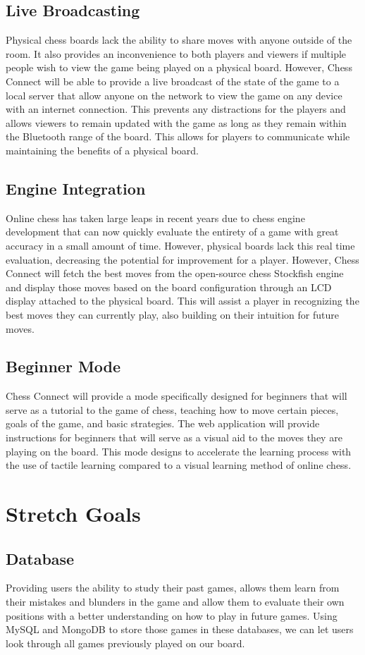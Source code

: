 \documentclass{article}
\begin{document}
\subsection{Live Broadcasting}
{Physical chess boards lack the ability to share moves with anyone outside of the room. It also provides an inconvenience to both players and viewers if multiple people wish to view the game being played on a physical board. However, Chess Connect will be able to provide a live broadcast of the state of the game to a local server that allow anyone on the network to view the game on any device with an internet connection. This prevents any distractions for the players and allows viewers to remain updated with the game as long as they remain within the Bluetooth range of the board. This allows for players to communicate while maintaining the benefits of a physical board.} 
\subsection{Engine Integration}
{Online chess has taken large leaps in recent years due to chess engine development that can now quickly evaluate the entirety of a game with great accuracy in a small amount of time. However, physical boards lack this real time evaluation, decreasing the potential for improvement for a player. However, Chess Connect will fetch the best moves from the open-source chess Stockfish engine and display those moves based on the board configuration through an LCD display attached to the physical board. This will assist a player in recognizing the best moves they can currently play, also building on their intuition for future moves.}
\subsection{Beginner Mode}
{Chess Connect will provide a mode specifically designed for beginners that will serve as a tutorial to the game of chess, teaching how to move certain pieces, goals of the game, and basic strategies. The web application will provide instructions for beginners that will serve as a visual aid to the moves they are playing on the board. This mode designs to accelerate the learning process with the use of tactile learning compared to a visual learning method of online chess.}

\section{Stretch Goals}
\subsection{Database}
Providing users the ability to study their past games, allows them learn from their mistakes and blunders in the game and allow them to evaluate their own positions with a better understanding on how to play in future games. Using MySQL and MongoDB to store those games in these databases, we can let users look through all games previously played on our board.
\end{document}
